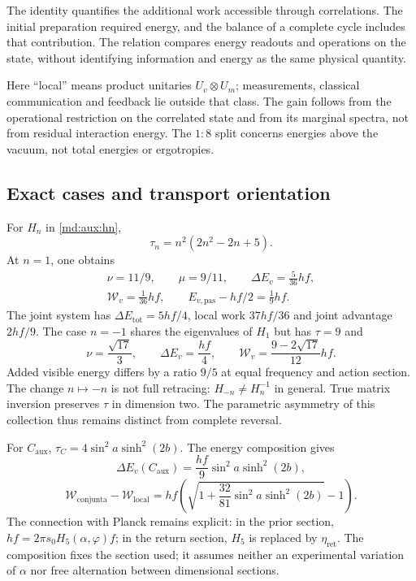 The identity quantifies the additional work accessible through
correlations. The initial preparation required energy, and the
balance of a complete cycle includes that contribution.
The relation compares energy readouts and operations on the state,
without identifying information and energy as the same physical
quantity.

Here “local” means product unitaries $U_v\otimes U_m$;
measurements, classical communication and feedback lie outside that
class. The gain follows from the operational restriction on the
correlated state and from its marginal spectra, not from residual
interaction energy. The $1:8$ split concerns energies above the vacuum,
not total energies or ergotropies.

\subsection{Exact cases and transport orientation}
\label{md:aux:casos-energia}

For $H_n$ in \eqref{md:aux:hn},
\begin{equation}
 \tau_n=n^2(2n^2-2n+5).
 \label{md:aux:tau-hn}
\end{equation}
At $n=1$, one obtains
\begin{equation}
 \begin{gathered}
 \nu=11/9,\qquad\mu=9/11,\qquad
 \Delta E_v=\frac5{36}hf,\\
 \mathcal W_v=\frac1{36}hf,\qquad
 E_{v,\mathrm{pas}}-hf/2=\frac19hf.
 \end{gathered}
 \label{md:aux:caso-positivo}
\end{equation}
The joint system has $\Delta E_{\mathrm{tot}}=5hf/4$, local work
$37hf/36$ and joint advantage $2hf/9$.
The case $n=-1$ shares the eigenvalues of $H_1$ but has $\tau=9$ and
\begin{equation}
 \nu=\frac{\sqrt{17}}3,\qquad
 \Delta E_v=\frac{hf}{4},\qquad
 \mathcal W_v=\frac{9-2\sqrt{17}}{12}hf.
 \label{md:aux:caso-negativo}
\end{equation}
Added visible energy differs by a ratio $9/5$ at equal frequency
and action section. The change $n\mapsto-n$ is not full retracing:
$H_{-n}\ne H_n^{-1}$ in general.
True matrix inversion preserves $\tau$ in dimension two.
The parametric asymmetry of this collection thus remains distinct from
complete reversal.

For $C_{\mathrm{aux}}$,
$\tau_C=4\sin^2a\sinh^2(2b)$. The energy composition gives
\begin{equation}
 \boxed{\Delta E_v(C_{\mathrm{aux}})
 =\frac{hf}{9}\sin^2a\sinh^2(2b),}
 \label{md:aux:energia-compensado}
\end{equation}
\begin{equation}
 \mathcal W_{\mathrm{conjunta}}-\mathcal W_{\mathrm{local}}
 =hf\left(\sqrt{1+\frac{32}{81}\sin^2a\sinh^2(2b)}-1\right).
 \label{md:aux:trabajo-compensado}
\end{equation}
The connection with Planck remains explicit: in the prior section,
$hf=2\pi s_0H_5(\alpha,\varphi)f$; in the return section,
$H_5$ is replaced by $\eta_{\mathrm{ret}}$.
The composition fixes the section used; it assumes neither an
experimental variation of $\alpha$ nor free alternation between
dimensional sections.

